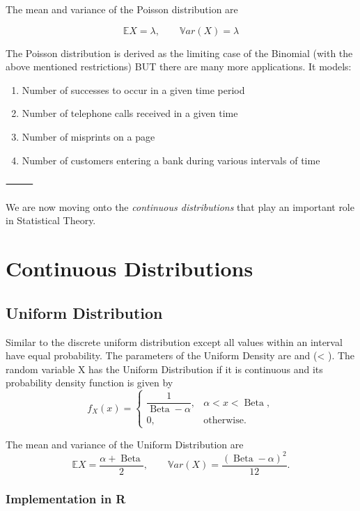 \documentclass[
  letterpaper,
  DIV=11,
  numbers=noendperiod]{scrreprt}
\begin{document}
The mean and variance of the Poisson distribution are

\[\mathbb EX = \lambda, \qquad \mathbb{V}ar(X) = \lambda\]

The Poisson distribution is derived as the limiting case of the Binomial
(with the above mentioned restrictions) BUT there are many more
applications. It models:

\begin{enumerate}
\def\labelenumi{\arabic{enumi}.}
\item
  Number of successes to occur in a given time period
\item
  Number of telephone calls received in a given time
\item
  Number of misprints on a page
\item
  Number of customers entering a bank during various intervals of time
\end{enumerate}

⸻

We are now moving onto the \emph{continuous distributions} that play an
important role in Statistical Theory.

\section{Continuous Distributions}\label{continuous-distributions}

\subsection{Uniform Distribution}\label{uniform-distribution}

Similar to the discrete uniform distribution except all values within an
interval have equal probability. The parameters of the Uniform Density
are \alpha and  (\alpha \textless{}
). The random variable X has the Uniform Distribution
if it is continuous and its probability density function is given by \[
f_X(x) =
\begin{cases}
\dfrac{1}{\operatorname{Beta}- \alpha}, & \alpha < x < \operatorname{Beta}, \\[1ex]
0, & \text{otherwise}.
\end{cases}
\]

The mean and variance of the Uniform Distribution are
\[\mathbb EX = \frac{\alpha + \operatorname{Beta}}{2},
\qquad
\mathbb{V}ar(X) = \frac{(\operatorname{Beta}- \alpha)^2}{12}.
\]

\subsubsection{Implementation in R}\label{implementation-in-r-4}
\end{document}
